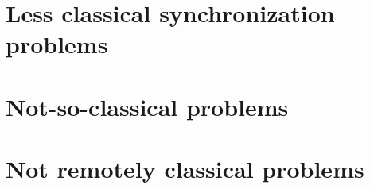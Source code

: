 \documentclass{book}
\newcommand{\clearemptydoublepage}{\newpage\cleardoublepage}
\newif\ifnotcompact
\def \localizationPath {en/}
\begin{document}


\clearemptydoublepage
\chapter{Less classical synchronization problems}
\label{next}



\clearemptydoublepage
\chapter{Not-so-classical problems}



\clearemptydoublepage
\chapter{Not remotely classical problems}



\ifnotcompact
\chapter{Synchronization in Python}
\label{pysync}



\chapter{Synchronization in C}
\label{csync}



\fi

{}




\ifnotcompact
\appendix

\chapter{Cleaning up Python threads}
\label{cleanup}



\chapter{Cleaning up POSIX threads}
\label{ccleanup}



\fi
\end{document}
